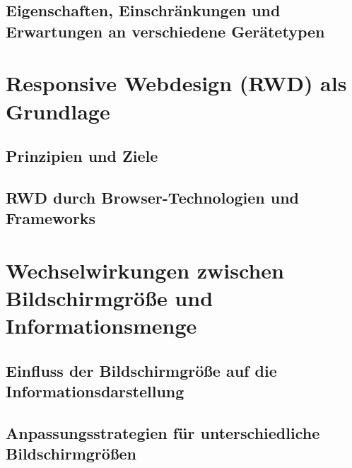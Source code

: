 \documentclass[conference,compsoc,final,a4paper]{IEEEtran}
\begin{document}
    \subsection{Eigenschaften, Einschränkungen und Erwartungen an verschiedene Gerätetypen}




    \section{Responsive Webdesign (RWD) als Grundlage}

    \subsection{Prinzipien und Ziele}

    \subsection{RWD durch Browser-Technologien und Frameworks}




    




    \section{Wechselwirkungen zwischen Bildschirmgröße und Informationsmenge}

    \subsection{Einfluss der Bildschirmgröße auf die Informationsdarstellung}

    \subsection{Anpassungsstrategien für unterschiedliche Bildschirmgrößen}


\end{document}
